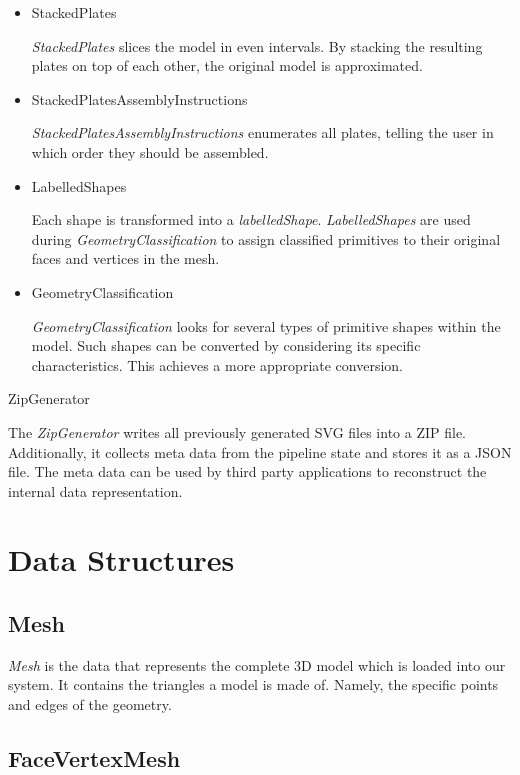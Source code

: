 \documentclass[../ClassicThesis.tex]{subfiles}
\begin{document}
\begin{itemize}
\item StackedPlates

\emph{StackedPlates} slices the model in even intervals. By stacking the resulting plates on top of each other, the original model is approximated.


\item StackedPlatesAssemblyInstructions

\emph{StackedPlatesAssemblyInstructions} enumerates all plates, telling the user in which order they should be assembled.


\item LabelledShapes

Each shape is transformed into a \emph{labelledShape}. \emph{LabelledShapes} are used during \emph{GeometryClassification} to assign classified primitives to their original faces and vertices in the mesh.


\item GeometryClassification

\emph{GeometryClassification} looks for several types of primitive shapes within the model. Such shapes can be converted by considering its specific characteristics. This achieves a more appropriate conversion.
\end{itemize}


\item ZipGenerator

The \emph{ZipGenerator} writes all previously generated SVG files into a ZIP file. Additionally, it collects meta data from the pipeline state and stores it as a JSON file. The meta data can be used by third party applications to reconstruct the internal data representation.





\section{Data Structures}

\subsection*{Mesh}

\emph{Mesh} is the data that represents the complete 3D model which is loaded into our system. It contains the triangles a model is made of. Namely, the specific points and edges of the geometry.

\subsection*{FaceVertexMesh}
\end{document}
